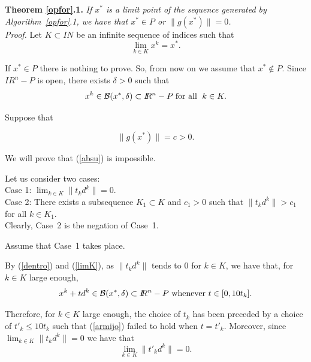 \documentclass{article}
\newcommand{\N}         {I\!\!N}
\newcommand{\R}         {I\!\!R}
\newcommand{\B}{{\cal B}}
\begin{document}
\noindent
{\bf Theorem \ref{opfor}.1.} {\it If $x^*$ is a limit point of the sequence generated by Algorithm~\ref{opfor}.1, we have that 
  $x^* \in P$ or 
  $\|g(x^*)\|=0$.}\\

\noindent
{\it Proof.} Let $K \subset \N$ be an infinite sequence of indices such that
\begin{equation} \label{limK}
\lim_{k \in K} x^k = x^*.
\end{equation}           

If $x^* \in P$ there is nothing to prove. So, from now on we assume that $x^* \notin P$. Since $\R^n - P$ is open, 
there exists $\delta > 0$ such that 
\begin{equation} \label{dentro}
x^k \in \B(x^*, \delta) \subset \R^n - P \;\mbox{for all }\; k \in K.
\end{equation}

Suppose that

\begin{equation} \label{absu}
  \|g(x^*)\|  = c > 0.
\end{equation}

We will prove that (\ref{absu}) is impossible.

Let us 
 consider two cases: \\

\noindent
Case 1: $\lim_{k \in K}\| t_k d^k\| = 0.$\\

\noindent
Case 2: There exists a subsequence $K_1 \subset K$ and $c_1 > 0$ such that $\|t_k d^k\| > c_1$ for all $k \in K_1$.\\

Clearly, Case~2 is the negation of Case~1. 

Assume that Case~1 takes place.

By (\ref{dentro}) and (\ref{limK}), as $\|t_k d^k\|$ tends to $0$ for $k \in K$, we have that, for $k \in K$ large enough,
\begin{equation} \label{diez}
  x^k + t d^k \in \B(x^*, \delta) \subset \R^n - P \mbox{ whenever } t \in [0, 10 t_k].
\end{equation} 



 Therefore, for $k \in K$ large enough, the choice of $t_k$ has been preceded by
 a choice of $t'_k \leq 10 t_k$ such that (\ref{armijo}) failed to hold when $t = t'_k$. Moreover, since 
 $\lim_{k \in K} \|t_k d^k\| = 0$ we have that
 \begin{equation} \label{liteli}
\lim_{k \in K} \|t'_k d^k\| = 0.
\end{equation}      
\end{document}
